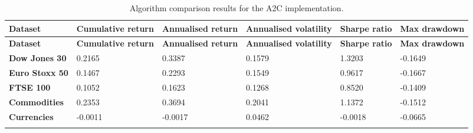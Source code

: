 \begin{longtable}{|l|p{2.1cm}|p{2.1cm}|p{2.1cm}|p{1.5cm}|p{2cm}|}
    \hline
    \textbf{Dataset} & \textbf{Cumulative return} & \textbf{Annualised return} & \textbf{Annualised volatility} & \textbf{Sharpe ratio} & \textbf{Max drawdown}  \\ \midrule
    \endfirsthead

    \hline
    \textbf{Dataset} & \textbf{Cumulative return} & \textbf{Annualised return} & \textbf{Annualised volatility} & \textbf{Sharpe ratio} & \textbf{Max drawdown}  \\ \midrule
    \endhead

    \endfoot
    \hline

    \textbf{Dow Jones 30} & 0.2165 & 0.3387 & 0.1579 & 1.3203 & -0.1649 \\ \hline
    \textbf{Euro Stoxx 50} & 0.1467 & 0.2293 & 0.1549 & 0.9617 & -0.1667 \\ \hline
    \textbf{FTSE 100} & 0.1052 & 0.1623 & 0.1268 & 0.8520 & -0.1409 \\ \hline
    \textbf{Commodities} & 0.2353 & 0.3694 & 0.2041 & 1.1372 & -0.1512 \\ \hline
    \textbf{Currencies} & -0.0011 & -0.0017 & 0.0462 & -0.0018 & -0.0665 \\ \hline 

    \caption{Algorithm comparison results for the A2C implementation.}
    \label{tab:experiment_algorithms_a2c}
\end{longtable}